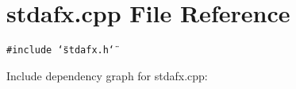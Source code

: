\section{stdafx.cpp File Reference}
\label{stdafx_8cpp}


{\tt \#include \char`\"{}stdafx.h\char`\"{}}\par


Include dependency graph for stdafx.cpp: